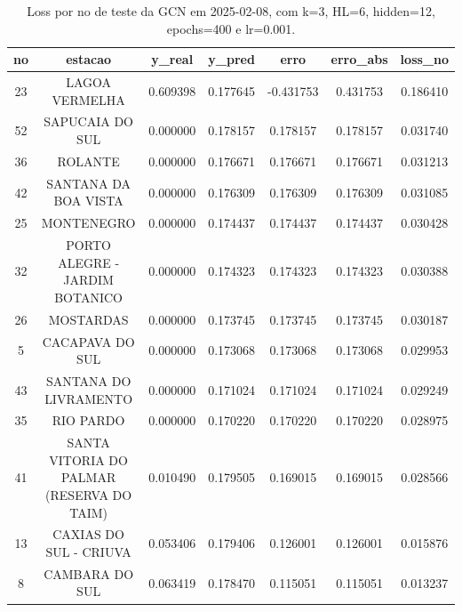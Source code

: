 \begin{table}[h]
\centering
\caption{Loss por no de teste da GCN em 2025-02-08, com k=3, HL=6, hidden=12, epochs=400 e lr=0.001.}
\label{tab:gcn_loss_k3_hl6_h12_e400_d20250208}
\begin{tabular}{ccccccc}
\toprule
no & estacao & y\_real & y\_pred & erro & erro\_abs & loss\_no \\
\midrule
23 & LAGOA VERMELHA & 0.609398 & 0.177645 & -0.431753 & 0.431753 & 0.186410 \\
52 & SAPUCAIA DO SUL & 0.000000 & 0.178157 & 0.178157 & 0.178157 & 0.031740 \\
36 & ROLANTE & 0.000000 & 0.176671 & 0.176671 & 0.176671 & 0.031213 \\
42 & SANTANA DA BOA VISTA & 0.000000 & 0.176309 & 0.176309 & 0.176309 & 0.031085 \\
25 & MONTENEGRO & 0.000000 & 0.174437 & 0.174437 & 0.174437 & 0.030428 \\
32 & PORTO ALEGRE - JARDIM BOTANICO & 0.000000 & 0.174323 & 0.174323 & 0.174323 & 0.030388 \\
26 & MOSTARDAS & 0.000000 & 0.173745 & 0.173745 & 0.173745 & 0.030187 \\
5 & CACAPAVA DO SUL & 0.000000 & 0.173068 & 0.173068 & 0.173068 & 0.029953 \\
43 & SANTANA DO LIVRAMENTO & 0.000000 & 0.171024 & 0.171024 & 0.171024 & 0.029249 \\
35 & RIO PARDO & 0.000000 & 0.170220 & 0.170220 & 0.170220 & 0.028975 \\
41 & SANTA VITORIA DO PALMAR (RESERVA DO TAIM) & 0.010490 & 0.179505 & 0.169015 & 0.169015 & 0.028566 \\
13 & CAXIAS DO SUL - CRIUVA & 0.053406 & 0.179406 & 0.126001 & 0.126001 & 0.015876 \\
8 & CAMBARA DO SUL & 0.063419 & 0.178470 & 0.115051 & 0.115051 & 0.013237 \\
\bottomrule
\end{tabular}
\end{table}
